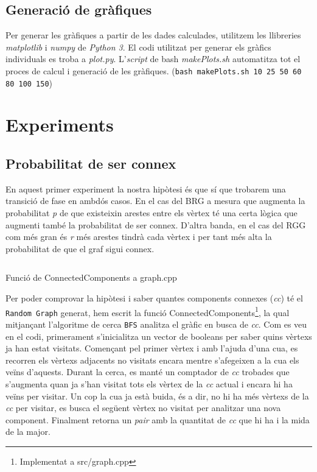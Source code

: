 \subsection{Generació de gràfiques}

Per generar les gràfiques a partir de les dades calculades, utilitzem les llibreries \emph{matplotlib} i 
\emph{numpy} de \emph{Python 3}. El codi utilitzat per generar els gràfics individuals es troba a \emph{plot.py}.
L'\emph{script} de bash \emph{makePlots.sh} automatitza tot el proces de calcul i generació de les gràfiques.
(\texttt{bash makePlots.sh 10 25 50 60 80 100 150})

\section{Experiments}
\subsection{Probabilitat de ser connex}
En aquest primer experiment la nostra hipòtesi és que sí que trobarem una transició de fase en ambdós casos. En el cas del BRG a mesura que augmenta la probabilitat \emph{p} de que existeixin arestes entre els vèrtex té una certa lògica que augmenti també la probabilitat de ser connex. D'altra banda, en el cas del RGG com més gran és \emph{r} més arestes tindrà cada vèrtex i per tant més alta la probabilitat de que el graf sigui connex.


\begin{listing}
\inputminted[firstline=83,lastline=122]{cpp}{src/graph.cpp}
\caption{Funció de ConnectedComponents a graph.cpp}
\end{listing}

Per poder comprovar la hipòtesi i saber quantes components connexes (\textit{cc}) té el \texttt{Random Graph} generat, hem escrit la funció ConnectedComponents\footnote{Implementat a src/graph.cpp}, la qual mitjançant l'algoritme de cerca \texttt{BFS} analitza el gràfic en busca de \textit{cc}. Com es veu en el codi, primerament s'inicialitza un vector de booleans per saber quins vèrtexs ja han estat visitats. Començant pel primer vèrtex i amb l'ajuda d'una cua, es recorren els vèrtexs adjacents no visitats encara mentre s'afegeixen a la cua els veïns d'aquests. Durant la cerca, es manté un comptador de \textit{cc} trobades que s'augmenta quan ja s'han visitat tots els vèrtex de la \textit{cc} actual i encara hi ha veïns per visitar. Un cop la cua ja està buida, és a dir, no hi ha més vèrtexs de la \textit{cc} per visitar, es busca el següent vèrtex no visitat per analitzar una nova component. Finalment retorna un \textit{pair} amb la quantitat de \textit{cc} que hi ha i la mida de la major.

